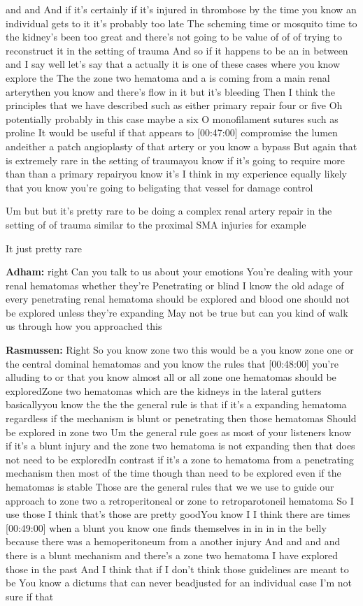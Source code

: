 \documentclass[
]{book}
\begin{document}
and and And if it's certainly if it's injured in thrombose by the time
you know an individual gets to it it's probably too late The scheming
time or mosquito time to the kidney's been too great and there's not
going to be value of of of trying to reconstruct it in the setting of
trauma And so if it happens to be an in between and I say well let's say
that a actually it is one of these cases where you know explore the The
the zone two hematoma and a is coming from a main renal arterythen you
know and there's flow in it but it's bleeding Then I think the
principles that we have described such as either primary repair four or
five Oh potentially probably in this case maybe a six O monofilament
sutures such as proline It would be useful if that appears to {[}00:47:00{]}
compromise the lumen andeither a patch angioplasty of that artery or you
know a bypass But again that is extremely rare in the setting of
traumayou know if it's going to require more than than a primary
repairyou know it's I think in my experience equally likely that you
know you're going to beligating that vessel for damage control

Um but but it's pretty rare to be doing a complex renal artery repair in
the setting of of trauma similar to the proximal SMA injuries for
example

It just pretty rare

\textbf{Adham:} right Can you talk to us about your emotions You're dealing
with your renal hematomas whether they're Penetrating or blind I know
the old adage of every penetrating renal hematoma should be explored and
blood one should not be explored unless they're expanding May not be
true but can you kind of walk us through how you approached this

\textbf{Rasmussen:} Right So you know zone two this would be a you know zone
one or the central dominal hematomas and you know the rules that
{[}00:48:00{]} you're alluding to or that you know almost all or all zone
one hematomas should be exploredZone two hematomas which are the kidneys
in the lateral gutters\\
basicallyyou know the the the general rule is that if it's a expanding
hematoma regardless if the mechanism is blunt or penetrating then those
hematomas Should be explored in zone two Um the general rule goes as
most of your listeners know if it's a blunt injury and the zone two
hematoma is not expanding then that does not need to be exploredIn
contrast if it's a zone to hematoma from a penetrating mechanism then
most of the time though than need to be explored even if the hematomas
is stable Those are the general rules that we we use to guide our
approach to zone two a retroperitoneal or zone to retroparotoneil
hematoma So I use those I think that's those are pretty goodYou know I I
think there are times {[}00:49:00{]} when a blunt you know one finds
themselves in in in in the belly because there was a hemoperitoneum from
a another injury And and and and there is a blunt mechanism and there's
a zone two hematoma I have explored those in the past And I think that
if I don't think those guidelines are meant to be You know a dictums
that can never beadjusted for an individual case I'm not sure if that
\end{document}
